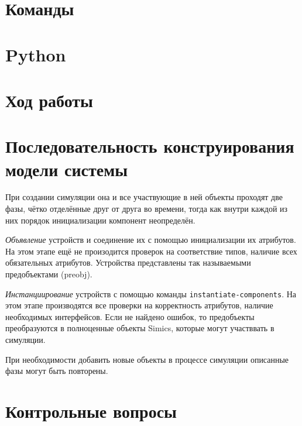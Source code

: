 \section{Команды}

\section{Python}

\section{Ход работы}

\todo 


\section{Последовательность конструирования модели системы}

При создании симуляции она и все участвующие в ней объекты проходят две фазы, чётко отделённые друг от друга во времени, тогда как внутри каждой из них порядок инициализации компонент неопределён.

\begin{enumerate*}

\item \textit{Объявление} устройств и соединение их с помощью инициализации их атрибутов. На этом этапе ещё не произодится проверок на соответствие типов, наличие всех обязательных атрибутов. Устройства представлены так называемыми предобъектами (\abbr preobj).

\item \textit{Инстанциирование} устройств с помощью команды \texttt{instantiate-components}. На этом этапе производятся все проверки на корректность атрибутов, наличие необходимых интерфейсов. Если не найдено ошибок, то предобъекты преобразуются в полноценные объекты Simics, которые могут участввать в симуляции.

\end{enumerate*}

При необходимости добавить новые объекты в процессе симуляции описанные фазы могут быть повторены.


\section{Контрольные вопросы}

